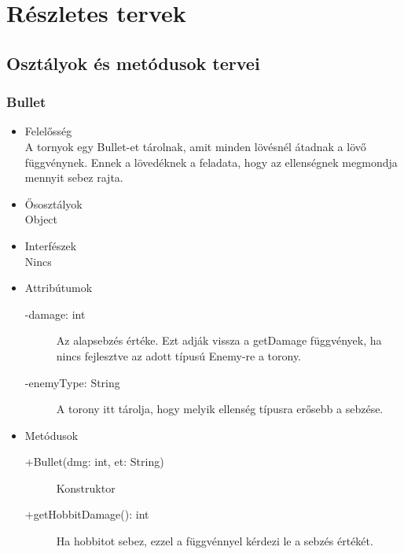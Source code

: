 %
\chapter{Részletes tervek}

\thispagestyle{fancy}

\section{Osztályok és metódusok tervei}

\subsection{Bullet}
\begin{itemize}
\item Felelősség\\
A tornyok egy Bullet-et tárolnak, amit minden lövésnél átadnak a lövő függvénynek. Ennek a lövedéknek a feladata, hogy az ellenségnek megmondja mennyit sebez rajta.
\item Ősosztályok\\
Object
\item Interfészek\\
Nincs
\item Attribútumok\\
	\begin{description}
		\item[-damage: int] Az alapsebzés értéke. Ezt adják vissza a getDamage függvények, ha nincs fejlesztve az adott típusú Enemy-re a torony. 
		\item[-enemyType: String] A torony itt tárolja, hogy melyik ellenség típusra erősebb a sebzése. 
	\end{description}
\item Metódusok\\
	\begin{description}
		\item[+Bullet(dmg: int, et: String)] Konstruktor
\item[+getHobbitDamage(): int] Ha hobbitot sebez, ezzel a függvénnyel kérdezi le a sebzés értékét. 

\end{description}
\end{itemize}
